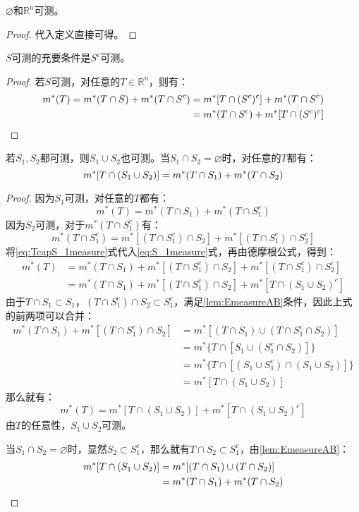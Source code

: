 \begin{theorem}
	$\varnothing$和$\mathbb{R}^n$可测。
\end{theorem}
\begin{proof}
	代入定义直接可得。
\end{proof}
\begin{theorem}
	$S$可测的充要条件是$S^c$可测。
\end{theorem}
\begin{proof}
	若$S$可测，对任意的$T\in\mathbb{R}^n$，则有：
	\begin{align*}
		m^*(T)=m^*(T\cap S)+m^*(T\cap S^c)
		&=m^*[T\cap(S^c)^c]+m^*(T\cap S^c) \\
		&=m^*(T\cap S^c)+m^*[T\cap(S^c)^c]\qedhere
	\end{align*} 
\end{proof}
\begin{theorem}
	若$S_1,S_2$都可测，则$S_1\cup S_2$也可测。当$S_1\cap S_2=\varnothing$时，对任意的$T$都有：
	\begin{equation}
		m^*[T\cap(S_1\cup S_2)]=m^*(T\cap S_1)+m^*(T\cap S_2)\notag
	\end{equation}
\end{theorem}
\begin{proof}
	因为$S_1$可测，对任意的$T$都有：
	\begin{equation}\label{eq:S_1measure}
		m^*(T)=m^*(T\cap S_1)+m^*(T\cap S_1^c)
	\end{equation}
	因为$S_2$可测，对于$m^*(T\cap S_1^c)$有：
	\begin{equation}\label{eq:TcapS_1measure}
		m^*(T\cap S_1^c)=m^*[(T\cap S_1^c)\cap S_2]+m^*[(T\cap S_1^c)\cap S_2^c]
	\end{equation}
	将\eqref{eq:TcapS_1measure}式代入\eqref{eq:S_1measure}式，再由德摩根公式，得到：
	\begin{align*}
		m^*(T)&=m^*(T\cap S_1)+m^*[(T\cap S_1^c)\cap S_2]+m^*[(T\cap S_1^c)\cap S_2^c] \\
		&=m^*(T\cap S_1)+m^*[(T\cap S_1^c)\cap S_2]+m^*[T\cap(S_1\cup S_2)^c]
	\end{align*}
	由于$T\cap S_1\subset S_1$，$(T\cap S_1^c)\cap S_2\subset S_1^c$，满足\cref{lem:EmeasureAB}条件，因此上式的前两项可以合并：
	\begin{align*}
		m^*(T\cap S_1)+m^*[(T\cap S_1^c)\cap S_2]&=m^*[(T\cap S_1)\cup(T\cap S_1^c\cap S_2)] \\
		&=m^*\{T\cap[S_1\cup(S_1^c\cap S_2)]\} \\
		&=m^*\{T\cap[(S_1\cup S_1^c)\cap(S_1\cup S_2)]\} \\
		&=m^*[T\cap(S_1\cup S_2)]
	\end{align*}
	那么就有：
	\begin{equation*}
		m^*(T)=m^*[T\cap(S_1\cup S_2)]+m^*[T\cap(S_1\cup S_2)^c]
	\end{equation*}
	由$T$的任意性，$S_1\cup S_2$可测。\par
	当$S_1\cap S_2=\varnothing$时，显然$S_2\subset S_1^c$，那么就有$T\cap S_2\subset S_1^c$，由\cref{lem:EmeasureAB}：
	\begin{align*}
		m^*[T\cap(S_1\cup S_2)]&=m^*[(T\cap S_1)\cup(T\cap S_2)]\\
		&=m^*(T\cap S_1)+m^*(T\cap S_2)\qedhere
	\end{align*}
\end{proof}
